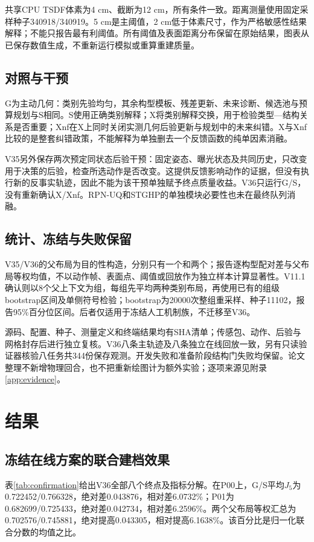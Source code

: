 \documentclass[11pt,a4paper]{article}
\begin{document}
共享CPU TSDF体素为4 cm、截断为12 cm，所有条件一致。距离测量使用固定采样种子340918/340919。5 cm是主阈值，2 cm低于体素尺寸，作为严格敏感性结果解释；不能只报告最有利阈值。所有阈值及表面距离分布保留在原始结果，图表从已保存数值生成，不重新运行模拟或重算重建质量。

\subsection{对照与干预}
G为主动几何：类别先验均匀，其余构型模板、残差更新、未来诊断、候选池与预算规划与S相同。S使用正确类别解释；X将类别解释交换，用于检验类型—结构关系是否重要；Xnf在X上同时关闭实测几何后验更新与规划中的未来纠错。X与Xnf比较的是整套纠错政策，不能解释为单独删去一个反馈函数的纯单因素消融。

V35另外保存两次预定同状态后验干预：固定姿态、曝光状态及共同历史，只改变用于决策的后验，检查所选动作是否改变。这提供反馈影响动作的证据，但没有执行新的反事实轨迹，因此不能为该干预单独赋予终点质量收益。V36只运行G/S，没有重新确认X/Xnf。RPN-UQ和STGHP的单独模块必要性也未在最终队列消融。

\subsection{统计、冻结与失败保留}
V35/V36的父布局为目的性构造，分别只有一个和两个；报告逐构型配对差与父布局等权均值，不以动作帧、表面点、阈值或回放作为独立样本计算显著性。V11.1确认则以8个父上下文为组，每组先平均两种类别布局，再使用已有的组级bootstrap区间及单侧符号检验；bootstrap为20000次整组重采样、种子11102，报告95\%百分位区间。后者仅适用于冻结人工机制族，不迁移至V36。

源码、配置、种子、测量定义和终端结果均有SHA清单；传感包、动作、后验与网格封存后进行独立复核。V36八条主轨迹及八条独立在线回放一致，另有只读验证器核验八任务共344份保存观测。开发失败和准备阶段结构门失败均保留。论文整理不新增物理回合，也不把重新绘图计为额外实验；逐项来源见附录\ref{app:evidence}。

\section{结果}
\subsection{冻结在线方案的联合建档效果}
表\ref{tab:confirmation}给出V36全部八个终点及指标分解。在P00上，G/S平均$J_5$为0.722452/0.766328，绝对差0.043876，相对差6.0732\%；P01为0.682699/0.725433，绝对差0.042734，相对差6.2596\%。两个父布局等权汇总为0.702576/0.745881，绝对提高0.043305，相对提高6.1638\%。该百分比是归一化联合分数的均值之比。
\end{document}
